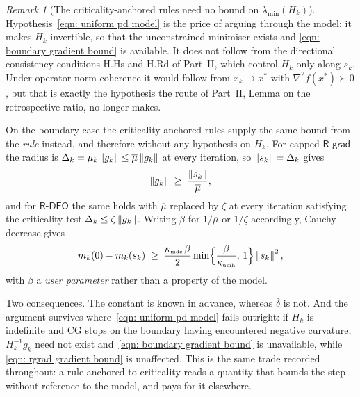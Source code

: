 \documentclass[11pt]{article}
\theoremstyle{plain}
\theoremstyle{definition}
\theoremstyle{remark}
\newtheorem{remark}[theorem]{Remark}
\numberwithin{equation}{section}
\newcommand*\mykappa[1]{\kappa_{\scriptscriptstyle\text{#1}}}
\newcommand{\Rdfo}{\textsf{R-DFO}}
\newcommand{\Rgrad}{\textsf{R-grad}}
\begin{document}
\begin{remark}[The criticality-anchored rules need no bound on $\lambda_{\min}(H_k)$]
\label{rem: mqd without delta bar}
    Hypothesis~\eqref{eqn: uniform pd model} is the price of arguing through the model: it makes
    $H_k$ invertible, so that the unconstrained minimiser exists and
    \eqref{eqn: boundary gradient bound} is available. It does not follow from the directional
    consistency conditions H.Hs and H.Rd of Part~II, which control $H_k$ only along $s_k$. Under
    operator-norm coherence it would follow from $x_k \to x^*$ with $\nabla^2 f(x^*) \succ 0$,
    but that is exactly the hypothesis the route of Part~II, Lemma on the retrospective ratio, no
    longer makes.

    On the boundary case the criticality-anchored rules supply the same bound from the
    \emph{rule} instead, and therefore without any hypothesis on $H_k$. For capped $\Rgrad$ the
    radius is $\Delta_k = \mu_k\left \lVert g_k \right \rVert \leq \overline{\mu}\left \lVert g_k \right \rVert$ at every iteration, so
    $\left \lVert s_k \right \rVert = \Delta_k$ gives
    \begin{equation}
        \left \lVert g_k \right \rVert \;\geq\; \frac{\left \lVert s_k \right \rVert}{\overline{\mu}} ,
        \label{eqn: rgrad gradient bound}
    \end{equation}
    and for $\Rdfo$ the same holds with $\overline{\mu}$ replaced by $\zeta$ at every iteration
    satisfying the criticality test $\Delta_k \leq \zeta\left \lVert g_k \right \rVert$. Writing $\beta$ for
    $1/\overline{\mu}$ or $1/\zeta$ accordingly, Cauchy decrease gives
    \begin{equation*}
        m_k(0) - m_k(s_k)
          \;\geq\; \frac{\mykappa{mdc}\,\beta}{2}
            \min\Bigl\{\frac{\beta}{\mykappa{umh}},\, 1\Bigr\}\norm{s_k}^2 ,
    \end{equation*}
    with $\beta$ a \emph{user parameter} rather than a property of the model.

    Two consequences. The constant is known in advance, whereas $\bar\delta$ is not. And the
    argument survives where~\eqref{eqn: uniform pd model} fails outright: if $H_k$ is indefinite
    and CG stops on the boundary having encountered negative curvature, $H_k^{-1}g_k$ need not
    exist and~\eqref{eqn: boundary gradient bound} is unavailable, while
    \eqref{eqn: rgrad gradient bound} is unaffected. This is the same trade recorded throughout:
    a rule anchored to criticality reads a quantity that bounds the step without reference to the
    model, and pays for it elsewhere.
\end{remark}
\end{document}
